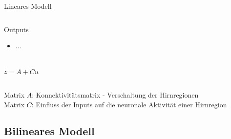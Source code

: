 \documentclass{beamer}
\begin{document}
\begin{frame}{Lineares Modell}
\begin{columns}
\begin{center}
{\begin{minipage}{\textwidth}
\begin{block}{Outputs}
\begin{itemize}
						\item ...
						\end{itemize}
					\end{block}
					\end{minipage}
				}\\
				\vspace{0.5cm}
				$\dot{z}=A+Cu$ 
			\end{center}
		\end{columns}	
		\vspace{0.5cm}
		\begin{small}
		Matrix $A$: Konnektivitätsmatrix - Verschaltung der Hirnregionen \\
		Matrix $C$: Einfluss der Inputs auf die neuronale Aktivität einer Hirnregion
	\end{small}		 
	\end{frame}
	
\subsection{Bilineares Modell}
	
\end{document}
